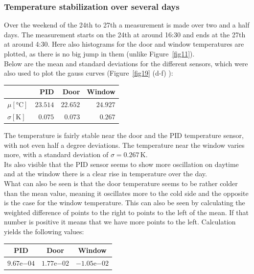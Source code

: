\documentclass[12pt]{scrartcl}
\begin{document}
      \subsubsection{Temperature stabilization over several days}
      Over the weekend of the 24th to 27th a measurement is made over two
      and a half days. The measurement starts on the 24th at around 16:30 and
      ends at the 27th at around 4:30. Here also histograms for the
      door and window temperatures are plotted, as there is no big jump in them (unlike
      Figure~\ref{fig11}).\\
      Below are the mean and standard deviations for the different sensors, which
      were also used to plot the gauss curves (Figure~\ref{fig19} (d-f) ):
      \\
      \begin{table}[H]
        \begin{tabular}{l | r | r | r}
          & PID & Door & Window \\
          \hline
          $\mu[\text{°C}]$ & $23.514$ & $22.652$ & $24.927$ \\
          $\sigma[\text{K}]$ & $0.075$ & $0.073$ & $0.267$
        \end{tabular}
      \end{table}
      The temperature is fairly stable near the door and the PID
      temperature sensor, with
      not even half a degree deviations. The temperature near the window varies
      more, with a standard deviation of $\sigma = 0.267\,\text{K}$.\\
      Its also visible that the PID sensor seems to show more oscillation on
      daytime and at the window there is a clear rise in temperature over the day.
      \\What can also be seen is that the door temperature seems to be rather
      colder than the mean value, meaning it oscillates more to the cold side
      and the opposite is the case for the window temperature. This can also be
      seen by calculating the weighted difference of points to the right to
      points to the left of the mean. If that number is positive it means that
      we have more points to the left.
      Calculation yields the following values: \vspace{-5pt}
      \begin{table}[H]
        \begin{tabular}{c | c | c}
          PID & Door & Window \\
          \hline
          $9.67\mathrm{e}{-04}$ & $1.77\mathrm{e}{-02}$ & $-1.05\mathrm{e}{-02}$
        \end{tabular}
      \end{table}
\end{document}
